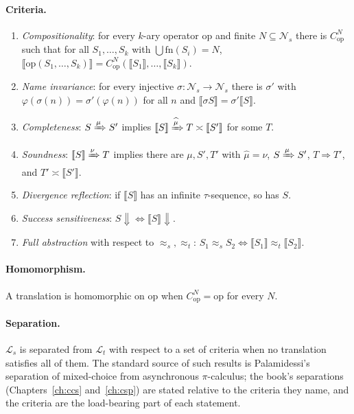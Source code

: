\documentclass[11pt,openany]{book}
\theoremstyle{remark}
\begin{document}
\paragraph{Criteria.}
\begin{enumerate}[label=(E\arabic*),leftmargin=2.5em]
\item \emph{Compositionality}: for every $k$-ary operator $\mathrm{op}$
and finite $N\subseteq\mathcal N_s$ there is $C^N_{\mathrm{op}}$ such that
for all $S_1,\ldots,S_k$ with $\bigcup\mathrm{fn}(S_i)=N$,
$\llbracket\mathrm{op}(S_1,\ldots,S_k)\rrbracket=
C^N_{\mathrm{op}}(\llbracket S_1\rrbracket,\ldots,\llbracket S_k\rrbracket)$.
\item \emph{Name invariance}: for every injective
$\sigma:\mathcal N_s\to\mathcal N_s$ there is $\sigma'$ with
$\varphi(\sigma(n))=\sigma'(\varphi(n))$ for all $n$ and
$\llbracket\sigma S\rrbracket=\sigma'\llbracket S\rrbracket$.
\item \emph{Completeness}: $S\xRightarrow{\mu}S'$ implies
$\llbracket S\rrbracket\xRightarrow{\widehat\mu}T\asymp\llbracket
S'\rrbracket$ for some $T$.
\item \emph{Soundness}: $\llbracket S\rrbracket\xRightarrow{\nu}T$
implies there are $\mu,S',T'$ with $\widehat\mu=\nu$,
$S\xRightarrow{\mu}S'$, $T\Rightarrow T'$, and $T'\asymp\llbracket
S'\rrbracket$.
\item \emph{Divergence reflection}: if $\llbracket S\rrbracket$ has an
infinite $\tau$-sequence, so has $S$.
\item \emph{Success sensitiveness}: $S\Downarrow\iff\llbracket
S\rrbracket\Downarrow$.
\item \emph{Full abstraction} with respect to $\approx_s,\approx_t$:
$S_1\approx_s S_2\iff\llbracket S_1\rrbracket\approx_t\llbracket
S_2\rrbracket$.
\end{enumerate}

\paragraph{Homomorphism.} A translation is homomorphic on
$\mathrm{op}$ when $C^N_{\mathrm{op}}=\mathrm{op}$ for every $N$.

\paragraph{Separation.} $\mathcal L_s$ is separated from $\mathcal L_t$
with respect to a set of criteria when no translation satisfies all of
them. The standard source of such results is Palamidessi's separation of
mixed-choice from asynchronous $\pi$-calculus; the book's separations
(Chapters~\ref{ch:ccs} and~\ref{ch:csp}) are stated relative to the
criteria they name, and the criteria are the load-bearing part of each
statement.
\end{document}
